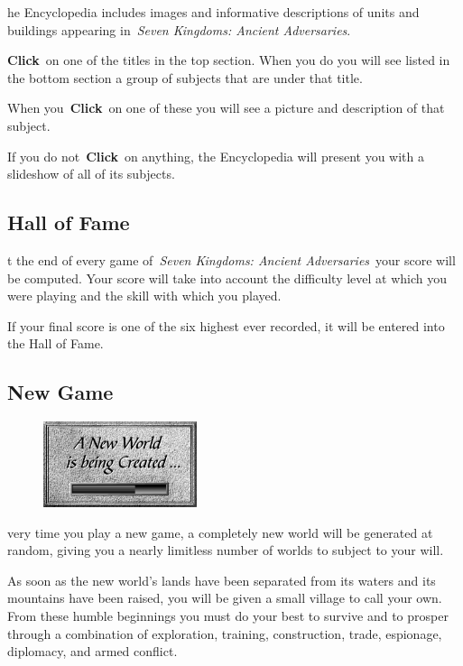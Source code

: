 he Encyclopedia includes images and informative descriptions of units and buildings appearing in \textit{Seven Kingdoms: Ancient Adversaries}.

\textbf{Click} on one of the titles in the top section. When you do you will see listed in the bottom section a group of subjects that are under that title.

When you \textbf{Click} on one of these you will see a picture and description of that subject.

If you do not \textbf{Click} on anything, the Encyclopedia will present you with a slideshow of all of its subjects.

\subsection{Hall of Fame}

t the end of every game of \textit{Seven Kingdoms: Ancient Adversaries} your score will be computed. Your score will take into account the difficulty level at which you were playing and the skill with which you played.

If your final score is one of the six highest ever recorded, it will be entered into the Hall of Fame.

\subsection{New Game}

\begin{figure}
	\begin{center}
		\vspace{-20pt}
		\includegraphics[width=0.4\textwidth]{Inewworld}
	\end{center}
\vspace{-20pt}
\end{figure}

very time you play a new game, a completely new world will be generated at random, giving you a nearly limitless number of worlds to subject to your will.

As soon as the new world’s lands have been separated from its waters and its mountains have been raised, you will be given a small village to call your own. From these humble beginnings you must do your best to survive and to prosper through a combination of exploration, training, construction, trade, espionage, diplomacy, and armed conflict.

